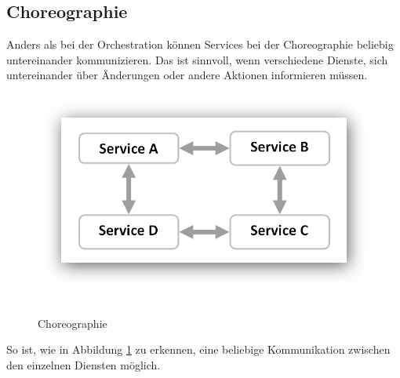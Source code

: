 \subsection*{Choreographie}
\label{subsec:choreographie}
Anders als bei der Orchestration können Services bei der Choreographie beliebig untereinander kommunizieren. Das ist sinnvoll, wenn verschiedene Dienste, sich untereinander über Änderungen oder andere Aktionen informieren müssen.
\newpage
\begin{figure}[htb]
    \centering 
    \includegraphics[width=\linewidth]{content/images/ServiceChoreography}\
    \caption[Choreographie]{Choreographie}
    \label{fig:ServiceChoreography}  
\end{figure}
So ist, wie in Abbildung \ref{fig:ServiceChoreography} zu erkennen, eine beliebige Kommunikation zwischen den einzelnen Diensten möglich.

